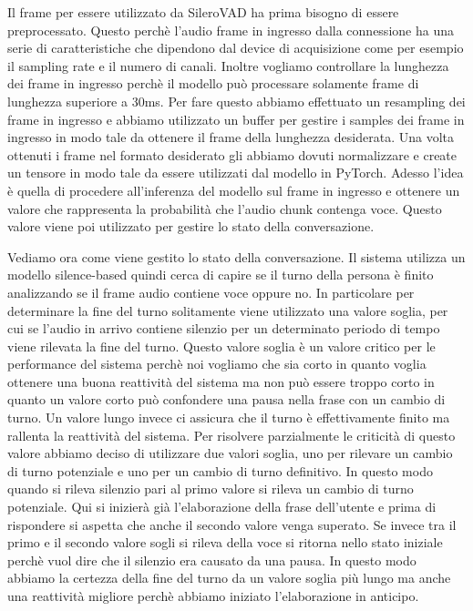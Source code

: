 \documentclass[12pt]{article}
\begin{document}
Il frame per essere utilizzato da SileroVAD ha prima bisogno di essere preprocessato. Questo perchè l'audio frame in ingresso dalla connessione ha una serie di caratteristiche che dipendono dal device di acquisizione come per esempio il sampling rate e il numero di canali. Inoltre vogliamo controllare la lunghezza dei frame in ingresso perchè il modello può processare solamente frame di lunghezza superiore a 30ms. Per fare questo abbiamo effettuato un resampling dei frame in ingresso e abbiamo utilizzato un buffer per gestire i samples dei frame in ingresso in modo tale da ottenere il frame della lunghezza desiderata. Una volta ottenuti i frame nel formato desiderato gli abbiamo dovuti normalizzare e create un tensore in modo tale da essere utilizzati dal modello in PyTorch. Adesso l'idea è quella di procedere all'inferenza del modello sul frame in ingresso e ottenere un valore che rappresenta la probabilità che l'audio chunk contenga voce. Questo valore viene poi utilizzato per gestire lo stato della conversazione.

Vediamo ora come viene gestito lo stato della conversazione. Il sistema utilizza un modello silence-based quindi cerca di capire se il turno della persona è finito analizzando se il frame audio contiene voce oppure no. In particolare per determinare la fine del turno solitamente viene utilizzato una valore soglia, per cui se l'audio in arrivo contiene silenzio per un determinato periodo di tempo viene rilevata la fine del turno. Questo valore soglia è un valore critico per le performance del sistema perchè noi vogliamo che sia corto in quanto voglia ottenere una buona reattività del sistema ma non può essere troppo corto in quanto un valore corto può confondere una pausa nella frase con un cambio di turno. Un valore lungo invece ci assicura che il turno è effettivamente finito ma rallenta la reattività del sistema. Per risolvere parzialmente le criticità di questo valore abbiamo deciso di utilizzare due valori soglia, uno per rilevare un cambio di turno potenziale e uno per un cambio di turno definitivo. In questo modo quando si rileva silenzio pari al primo valore si rileva un cambio di turno potenziale. Qui si inizierà già l'elaborazione della frase dell'utente e prima di rispondere si aspetta che anche il secondo valore venga superato. Se invece tra il primo e il secondo valore sogli si rileva della voce si ritorna nello stato iniziale perchè vuol dire che il silenzio era causato da una pausa. In questo modo abbiamo la certezza della fine del turno da un valore soglia più lungo ma anche una reattività migliore perchè abbiamo iniziato l'elaborazione in anticipo.  
\end{document}
